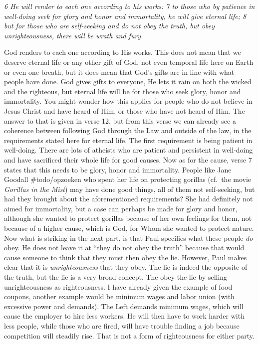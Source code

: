 \emph{6 He will render to each one according to his works: 7 to those
who by patience in well-doing seek for glory and honor and immortality,
he will give eternal life; 8 but for those who are self-seeking and do
not obey the truth, but obey unrighteousness, there will be wrath and
fury.}

God renders to each one according to His works. This does not mean that
we deserve eternal life or any other gift of God, not even temporal life
here on Earth or even one breath, but it does mean that God's gifts are
in line with what people have done. God gives gifts to everyone, He lets
it rain on both the wicked and the righteous, but eternal life will be
for those who seek glory, honor and immortality. You might wonder how
this applies for people who do not believe in Jesus Christ and have
heard of Him, or those who have not heard of Him. The answer to that is
given in verse 12, but from this verse we can already see a coherence
between following God through the Law and outside of the law, in the
requirements stated here for eternal life. The first requirement is
being patient in well-doing. There are lots of atheists who are patient
and persistent in well-doing and have sacrificed their whole life for
good causes. Now as for the cause, verse 7 states that this needs to be
glory, honor and immortality. People like Jane Goodall \#todo/opzoeken
who spent her life on protecting gorillas (cf.~the movie \emph{Gorillas
in the Mist}) may have done good things, all of them not self-seeking,
but had they brought about the aforementioned requirements? She had
definitely not aimed for immortality, but a case can perhaps be made for
glory and honor, although she wanted to protect gorillas because of her
own feelings for them, not because of a higher cause, which is God, for
Whom she wanted to protect nature. Now what is striking in the next
part, is that Paul specifies what these people \emph{do} obey. He does
not leave it at ``they do not obey the truth'' because that would cause
someone to think that they must then obey the lie. However, Paul makes
clear that it is \emph{unrighteousness} that they obey. The lie is
indeed the opposite of the truth, but the lie is a very broad concept.
The obey the lie by selling unrighteousness as righteousness. I have
already given the example of food coupons, another example would be
minimum wages and labor union (with excessive power and demands). The
Left demands minimum wages, which will cause the employer to hire less
workers. He will then have to work harder with less people, while those
who are fired, will have trouble finding a job because competition will
steadily rise. That is not a form of righteousness for either party.

